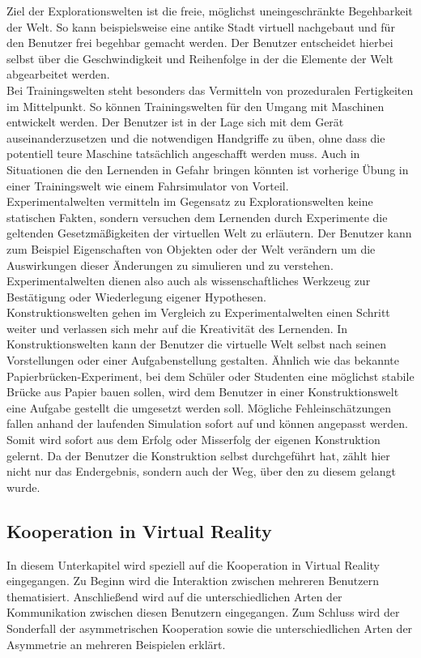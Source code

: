 Ziel der Explorationswelten ist die freie, möglichst uneingeschränkte Begehbarkeit der Welt. So kann beispielsweise eine antike Stadt virtuell nachgebaut und für den Benutzer frei begehbar gemacht werden. Der Benutzer entscheidet hierbei selbst über die Geschwindigkeit und Reihenfolge in der die Elemente der Welt abgearbeitet werden. \\

Bei Trainingswelten steht besonders das Vermitteln von prozeduralen Fertigkeiten im Mittelpunkt. So können Trainingswelten für den Umgang mit Maschinen entwickelt werden. Der Benutzer ist in der Lage sich mit dem Gerät auseinanderzusetzen und die notwendigen Handgriffe zu üben, ohne dass die potentiell teure Maschine tatsächlich angeschafft werden muss. Auch in Situationen die den Lernenden in Gefahr bringen könnten ist vorherige Übung in einer Trainingswelt wie einem Fahrsimulator von Vorteil. \\

Experimentalwelten vermitteln im Gegensatz zu Explorationswelten keine statischen Fakten, sondern versuchen dem Lernenden durch Experimente die geltenden Gesetzmäßigkeiten der virtuellen Welt zu erläutern. Der Benutzer kann zum Beispiel Eigenschaften von Objekten oder der Welt verändern um die Auswirkungen dieser Änderungen zu simulieren und zu verstehen. Experimentalwelten dienen also auch als wissenschaftliches Werkzeug zur Bestätigung oder Wiederlegung eigener Hypothesen. \\

Konstruktionswelten gehen im Vergleich zu Experimentalwelten einen Schritt weiter und verlassen sich mehr auf die Kreativität des Lernenden. In Konstruktionswelten kann der Benutzer die virtuelle Welt selbst nach seinen Vorstellungen oder einer Aufgabenstellung gestalten. Ähnlich wie das bekannte Papierbrücken-Experiment, bei dem Schüler oder Studenten eine möglichst stabile Brücke aus Papier bauen sollen, wird dem Benutzer in einer Konstruktionswelt eine Aufgabe gestellt die umgesetzt werden soll. Mögliche Fehleinschätzungen fallen anhand der laufenden Simulation sofort auf und können angepasst werden. Somit wird sofort aus dem Erfolg oder Misserfolg der eigenen Konstruktion gelernt. Da der Benutzer die Konstruktion selbst durchgeführt hat, zählt hier nicht nur das Endergebnis, sondern auch der Weg, über den zu diesem gelangt wurde. \\

\subsection{Kooperation in Virtual Reality}
In diesem Unterkapitel wird speziell auf die Kooperation in Virtual Reality eingegangen. Zu Beginn wird die Interaktion zwischen mehreren Benutzern thematisiert. Anschließend wird auf die unterschiedlichen Arten der Kommunikation zwischen diesen Benutzern eingegangen. Zum Schluss wird der Sonderfall der asymmetrischen Kooperation sowie die unterschiedlichen Arten der Asymmetrie an mehreren Beispielen erklärt.

